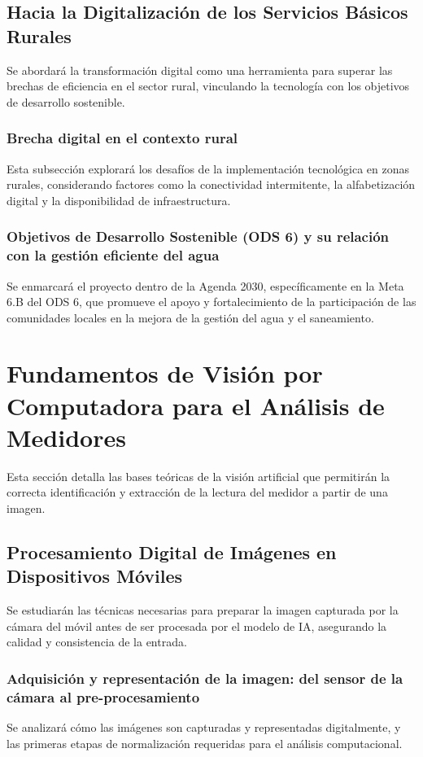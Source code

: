 \subsection{Hacia la Digitalización de los Servicios Básicos Rurales}
\label{ssec:digitalizacion_rural}
Se abordará la transformación digital como una herramienta para superar las brechas de eficiencia en el sector rural, vinculando la tecnología con los objetivos de desarrollo sostenible.

\subsubsection{Brecha digital en el contexto rural}
\label{sssec:brecha_digital}
Esta subsección explorará los desafíos de la implementación tecnológica en zonas rurales, considerando factores como la conectividad intermitente, la alfabetización digital y la disponibilidad de infraestructura.

\subsubsection{Objetivos de Desarrollo Sostenible (ODS 6) y su relación con la gestión eficiente del agua}
\label{sssec:ods6}
Se enmarcará el proyecto dentro de la Agenda 2030, específicamente en la Meta 6.B del ODS 6, que promueve el apoyo y fortalecimiento de la participación de las comunidades locales en la mejora de la gestión del agua y el saneamiento.

\section{Fundamentos de Visión por Computadora para el Análisis de Medidores}
\label{sec:vision_computadora}
Esta sección detalla las bases teóricas de la visión artificial que permitirán la correcta identificación y extracción de la lectura del medidor a partir de una imagen.

\subsection{Procesamiento Digital de Imágenes en Dispositivos Móviles}
\label{ssec:pdi_movil}
Se estudiarán las técnicas necesarias para preparar la imagen capturada por la cámara del móvil antes de ser procesada por el modelo de IA, asegurando la calidad y consistencia de la entrada.

\subsubsection{Adquisición y representación de la imagen: del sensor de la cámara al pre-procesamiento}
\label{sssec:adquisicion_imagen}
Se analizará cómo las imágenes son capturadas y representadas digitalmente, y las primeras etapas de normalización requeridas para el análisis computacional.

